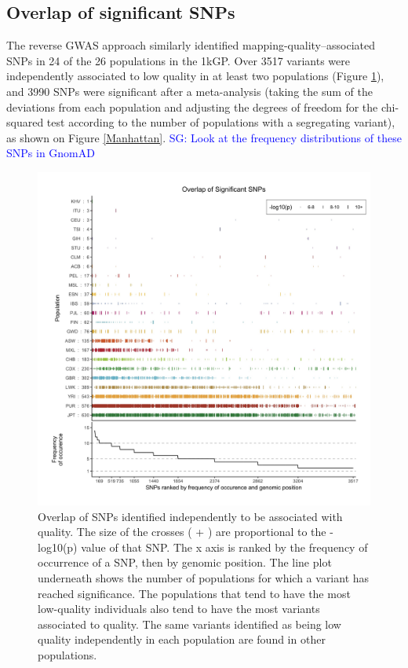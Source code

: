 \documentclass[9pt,lineno]{elife}
\newcommand{\sgcomment}[1]{\textcolor{blue}{SG: #1}}
\begin{document}
\subsection{Overlap of significant SNPs}
The reverse GWAS approach similarly identified mapping-quality--associated SNPs in 24 of the 26 populations in the 1kGP.
Over 3517 variants were independently associated to low quality in at least two populations  (Figure \ref{OverLap}), and 3990 SNPs were significant after a meta-analysis (taking the sum of the deviations from each population and adjusting the degrees of freedom for the chi-squared test according to the number of populations with a segregating variant), as shown on Figure \ref{Manhattan}.  
\sgcomment{Look at the frequency distributions of these SNPs in GnomAD}

\begin{figure}
\includegraphics[width=\hsize,keepaspectratio]{./Figures/SNPOverlap6.jpg}

\caption{Overlap of SNPs identified independently to be associated with quality. 
The size of the crosses ( + ) are proportional to the -log10(p) value of that SNP.
The x axis is ranked by the frequency of occurrence of a SNP, then by genomic position.
The line plot underneath shows the number of populations for which a variant has reached significance.
The populations that tend to have the most low-quality individuals also tend to have the most variants associated to quality. 
The same variants identified as being low quality independently in each population are found in other populations. }
  \label{OverLap}
\end{figure}
\end{document}
